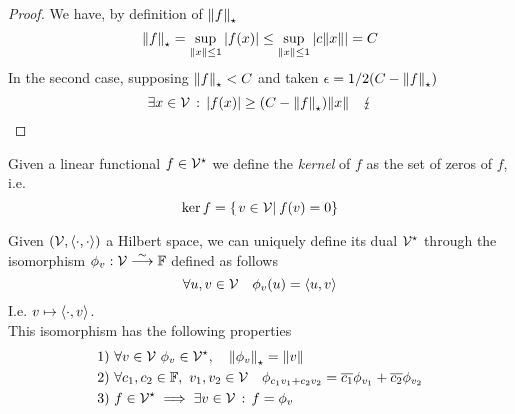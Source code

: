 \documentclass[../complete.tex]{subfiles}
\begin{document}
\begin{proof}
	We have, by definition of $\dnorm{f}$
	\begin{equation*}
		\dnorm{f}=\sup_{\norm{x}\le1}\abs{f(x)}\le\sup_{\norm{x}\le1}\abs{c\norm{x}}=C
	\end{equation*}
	In the second case, supposing $\dnorm{f}<C$ and taken $\epsilon=1/2(C-\dnorm{f})$
	\begin{equation*}
		\exists x\in\V\st\abs{f(x)}\ge(C-\dnorm{f})\norm{x}\quad\lightning
	\end{equation*}
\end{proof}
\begin{dfn}[Kernel]
	Given a linear functional $f\in\V^\star$ we define the \textit{kernel} of $f$ as the set of zeros of $f$, i.e.
	\begin{equation}
		\ker f=\left\{ \derin{v\in\V}f(v)=0 \right\}
		\label{eq:kernel}
	\end{equation}
\end{dfn}
\begin{thm}
	Given $(\V,\sprd)$ a Hilbert space, we can uniquely define its dual $\V^\star$ through the isomorphism $\phi_v:\V\fto[\sim]\F$ defined as follows
	\begin{equation*}
		\forall u,v\in\V\quad\phi_v(u)=\spr{u}{v}
	\end{equation*}
	I.e. $v\mapsto\spr{\cdot}{v}$.\\
	This isomorphism has the following properties
	\begin{equation}
		\begin{aligned}
			1)&\ \forall v\in\V\ \phi_v\in\V^\star,\quad\dnorm{\phi_v}=\norm{v}\\
			2)&\ \forall c_1,c_2\in\F,\ v_1,v_2\in\V\quad\phi_{c_1v_1+c_2v_2}=\cc{c_1}\phi_{v_1}+\cc{c_2}\phi_{v_2}\\
			3)&\ f\in\V^\star\implies\exists v\in\V\st f=\phi_v
		\end{aligned}
		\label{eq:rieszthm}
	\end{equation}
\end{thm}
\end{document}
